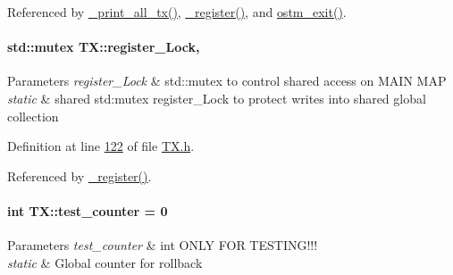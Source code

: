 Referenced by \hyperlink{_t_x_8cpp_source_l00346}{\+\_\+print\+\_\+all\+\_\+tx()}, \hyperlink{_t_x_8cpp_source_l00104}{\+\_\+register()}, and \hyperlink{_t_x_8cpp_source_l00072}{ostm\+\_\+exit()}.

\paragraph[{\texorpdfstring{register\+\_\+\+Lock}{register_Lock}}]{\setlength{\rightskip}{0pt plus 5cm}std\+::mutex T\+X\+::register\+\_\+\+Lock\hspace{0.3cm}{\ttfamily [static]}, {\ttfamily [private]}}\hypertarget{class_t_x_aa688a8c96fa3cdf8cd92e267463536dc_aa688a8c96fa3cdf8cd92e267463536dc}{}\label{class_t_x_aa688a8c96fa3cdf8cd92e267463536dc_aa688a8c96fa3cdf8cd92e267463536dc}

\begin{DoxyParams}{Parameters}
{\em register\+\_\+\+Lock} & std\+::mutex to control shared access on M\+A\+IN M\+AP\\
\hline
{\em static} & shared std\+:mutex register\+\_\+\+Lock to protect writes into shared global collection \\
\hline
\end{DoxyParams}


Definition at line \hyperlink{_t_x_8h_source_l00122}{122} of file \hyperlink{_t_x_8h_source}{T\+X.\+h}.



Referenced by \hyperlink{_t_x_8cpp_source_l00104}{\+\_\+register()}.

\paragraph[{\texorpdfstring{test\+\_\+counter}{test_counter}}]{\setlength{\rightskip}{0pt plus 5cm}int T\+X\+::test\+\_\+counter = 0\hspace{0.3cm}{\ttfamily [static]}}\hypertarget{class_t_x_a25838234aab99ae891a90eb8623a8b3c_a25838234aab99ae891a90eb8623a8b3c}{}\label{class_t_x_a25838234aab99ae891a90eb8623a8b3c_a25838234aab99ae891a90eb8623a8b3c}

\begin{DoxyParams}{Parameters}
{\em test\+\_\+counter} & int O\+N\+LY F\+OR T\+E\+S\+T\+I\+N\+G!!!\\
\hline
{\em static} & Global counter for rollback \\
\hline
\end{DoxyParams}


